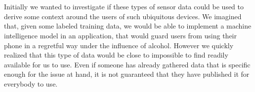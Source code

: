 \\\\
Initially we wanted to investigate if these types of sensor data could be used to derive some context around the users of such ubiquitous devices. We imagined that, given some labeled training data, we would be able to implement a machine intelligence model in an application, that would guard users from using their phone in a regretful way under the influence of alcohol. However we quickly realized that this type of data would be close to impossible to find readily available for us to use. Even if someone has already gathered data that is specific enough for the issue at hand, it is not guaranteed that they have published it for everybody to use.
